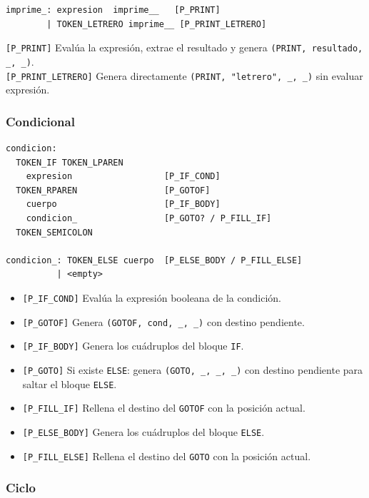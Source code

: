 \documentclass[12pt, letterpaper]{article}
\theoremstyle{definition}
\begin{document}
\begin{verbatim}
imprime_: expresion  imprime__   [P_PRINT]
        | TOKEN_LETRERO imprime__ [P_PRINT_LETRERO]
\end{verbatim}

\texttt{[P\_PRINT]} Evalúa la expresión, extrae el resultado y genera \texttt{(PRINT, resultado, \_, \_)}.\\
\texttt{[P\_PRINT\_LETRERO]} Genera directamente \texttt{(PRINT, "letrero", \_, \_)} sin evaluar expresión.

\subsubsection*{Condicional }

\begin{verbatim}
condicion:
  TOKEN_IF TOKEN_LPAREN
    expresion                  [P_IF_COND]
  TOKEN_RPAREN                 [P_GOTOF]
    cuerpo                     [P_IF_BODY]
    condicion_                 [P_GOTO? / P_FILL_IF]
  TOKEN_SEMICOLON

condicion_: TOKEN_ELSE cuerpo  [P_ELSE_BODY / P_FILL_ELSE]
          | <empty>
\end{verbatim}

\begin{itemize}
    \item \texttt{[P\_IF\_COND]} Evalúa la expresión booleana de la condición.
    \item \texttt{[P\_GOTOF]} Genera \texttt{(GOTOF, cond, \_, \_)} con destino pendiente.
    \item \texttt{[P\_IF\_BODY]} Genera los cuádruplos del bloque \texttt{IF}.
    \item \texttt{[P\_GOTO]} Si existe \texttt{ELSE}: genera \texttt{(GOTO, \_, \_, \_)} con destino pendiente para saltar el bloque \texttt{ELSE}.
    \item \texttt{[P\_FILL\_IF]} Rellena el destino del \texttt{GOTOF} con la posición actual.
    \item \texttt{[P\_ELSE\_BODY]} Genera los cuádruplos del bloque \texttt{ELSE}.
    \item \texttt{[P\_FILL\_ELSE]} Rellena el destino del \texttt{GOTO} con la posición actual.
\end{itemize}

\subsubsection*{Ciclo }
\end{document}
